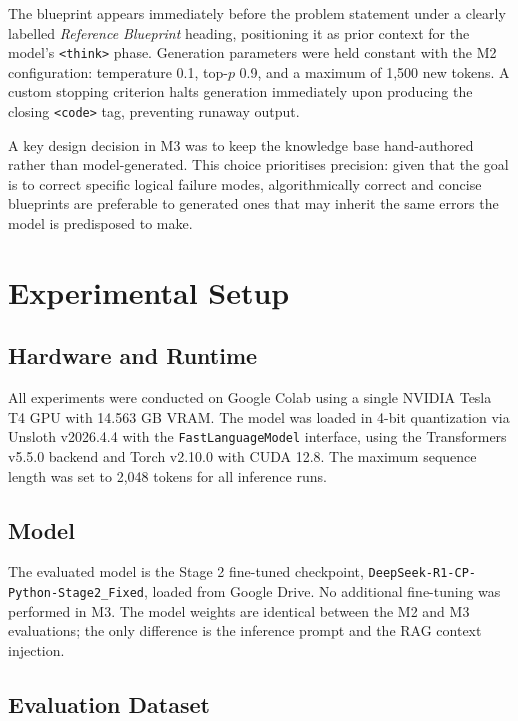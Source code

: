 \documentclass[12pt,a4paper]{article}
\begin{document}
The blueprint appears immediately before the problem statement under a clearly labelled \textit{Reference Blueprint} heading, positioning it as prior context for the model's \texttt{<think>} phase. Generation parameters were held constant with the M2 configuration: temperature 0.1, top-$p$ 0.9, and a maximum of 1,500 new tokens. A custom stopping criterion halts generation immediately upon producing the closing \texttt{<code>} tag, preventing runaway output.

A key design decision in M3 was to keep the knowledge base hand-authored rather than model-generated. This choice prioritises precision: given that the goal is to correct specific logical failure modes, algorithmically correct and concise blueprints are preferable to generated ones that may inherit the same errors the model is predisposed to make.

\section{Experimental Setup}
\label{sec:setup}

\subsection{Hardware and Runtime}

All experiments were conducted on Google Colab using a single NVIDIA Tesla T4 GPU with 14.563 GB VRAM. The model was loaded in 4-bit quantization via Unsloth v2026.4.4 with the \texttt{FastLanguageModel} interface, using the Transformers v5.5.0 backend and Torch v2.10.0 with CUDA 12.8. The maximum sequence length was set to 2,048 tokens for all inference runs.

\subsection{Model}

The evaluated model is the Stage 2 fine-tuned checkpoint, \texttt{DeepSeek-R1-CP-Python-Stage2\_Fixed}, loaded from Google Drive. No additional fine-tuning was performed in M3. The model weights are identical between the M2 and M3 evaluations; the only difference is the inference prompt and the RAG context injection.

\subsection{Evaluation Dataset}
\end{document}
